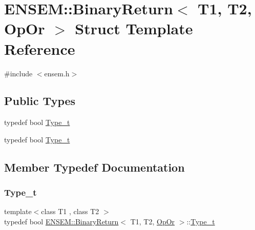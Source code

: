 \hypertarget{structENSEM_1_1BinaryReturn_3_01T1_00_01T2_00_01OpOr_01_4}{}\section{E\+N\+S\+EM\+:\+:Binary\+Return$<$ T1, T2, Op\+Or $>$ Struct Template Reference}
\label{structENSEM_1_1BinaryReturn_3_01T1_00_01T2_00_01OpOr_01_4}


{\ttfamily \#include $<$ensem.\+h$>$}

\subsection*{Public Types}
\begin{DoxyCompactItemize}
\item 
typedef bool \mbox{\hyperlink{structENSEM_1_1BinaryReturn_3_01T1_00_01T2_00_01OpOr_01_4_acabcdd16b12fa1840e7408d6b811491e}{Type\+\_\+t}}
\item 
typedef bool \mbox{\hyperlink{structENSEM_1_1BinaryReturn_3_01T1_00_01T2_00_01OpOr_01_4_acabcdd16b12fa1840e7408d6b811491e}{Type\+\_\+t}}
\end{DoxyCompactItemize}


\subsection{Member Typedef Documentation}
\mbox{\label{structENSEM_1_1BinaryReturn_3_01T1_00_01T2_00_01OpOr_01_4_acabcdd16b12fa1840e7408d6b811491e}} 
\subsubsection{\texorpdfstring{Type\_t}{Type\_t}\hspace{0.1cm}{\footnotesize\ttfamily [1/2]}}
{\footnotesize\ttfamily template$<$class T1 , class T2 $>$ \\
typedef bool \mbox{\hyperlink{structENSEM_1_1BinaryReturn}{E\+N\+S\+E\+M\+::\+Binary\+Return}}$<$ T1, T2, \mbox{\hyperlink{structENSEM_1_1OpOr}{Op\+Or}} $>$\+::\mbox{\hyperlink{structENSEM_1_1BinaryReturn_3_01T1_00_01T2_00_01OpOr_01_4_acabcdd16b12fa1840e7408d6b811491e}{Type\+\_\+t}}}


